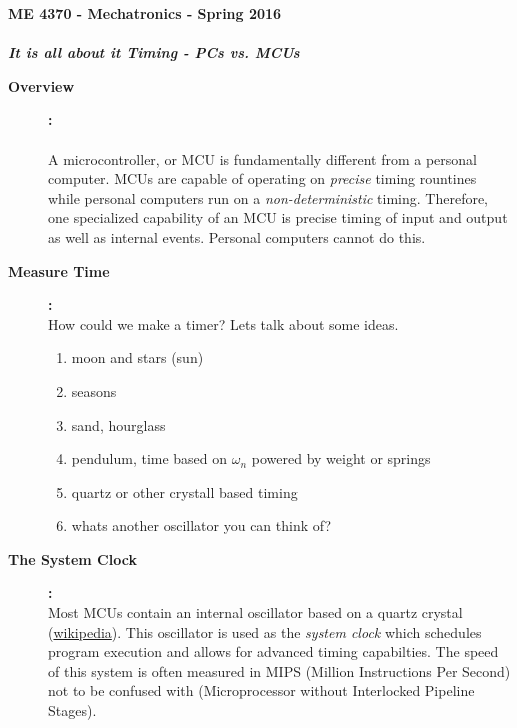 \documentclass[11pt]{article}
\begin{document}
    
	\textbf{\LARGE ME 4370 - Mechatronics - Spring 2016}\\\\
	\textbf{\LARGE {\it It is all about it Timing - PCs vs. MCUs}}\\
	    \begin{description}
        \item[\textbf{Overview}]\textbf{:}\\\\
        
            A microcontroller, or MCU is fundamentally different from a personal computer. MCUs are capable of operating on {\it precise} timing rountines while personal computers run on a {\it non-deterministic} timing. Therefore, one specialized capability of an MCU is precise timing of input and output as well as internal events. Personal computers cannot do this. 
        
        \item[\textbf{Measure Time}]\textbf{:}\\    
            
            How could we make a timer? Lets talk about some ideas. 
                \begin{enumerate}
                    \item moon and stars (sun)
                    \item seasons
                    \item sand, hourglass
                    \item pendulum, time based on $\omega_n$ powered by weight or springs
					\item quartz or other crystall based timing
					\item whats another oscillator you can think of?
                \end{enumerate}
            
		\item[\textbf{The System Clock}]\textbf{:}\\ 
			
			Most MCUs contain an internal oscillator based on a quartz crystal (\href{https://en.wikipedia.org/wiki/Crystal_oscillator}{wikipedia}). This oscillator is used as the {\it system clock} which schedules program execution and allows for advanced timing capabilties. The speed of this system is often measured in MIPS (Million Instructions Per Second) not to be confused with (Microprocessor without Interlocked Pipeline Stages).\\
			

\end{description}
\end{document}

